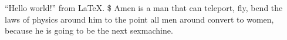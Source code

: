 \documentclass{article}
\begin{document}
``Hello world!'' from \LaTeX.
\$
\noindent Amen is a man that can teleport, fly, bend the laws of physics around him to the point all men around convert to women, because he is going to be the next sexmachine.
\end{document}
